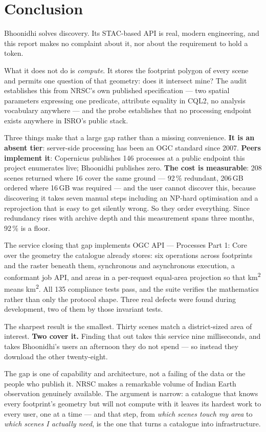 \section{Conclusion}

Bhoonidhi solves discovery. Its STAC-based API is real, modern engineering, and
this report makes no complaint about it, nor about the requirement to hold a
token.

What it does not do is \emph{compute}. It stores the footprint polygon of every
scene and permits one question of that geometry: does it intersect mine? The
audit establishes this from NRSC's own published specification --- two spatial
parameters expressing one predicate, attribute equality in CQL2, no analysis
vocabulary anywhere --- and the probe establishes that no processing endpoint
exists anywhere in ISRO's public stack.

Three things make that a large gap rather than a missing convenience.
\textbf{It is an absent tier}: server-side processing has been an OGC standard
since 2007. \textbf{Peers implement it}: Copernicus publishes 146 processes at a
public endpoint this project enumerates live; Bhoonidhi publishes zero.
\textbf{The cost is measurable}: 208 scenes returned where 16 cover the same
ground --- 92\,\% redundant, 206\,GB ordered where 16\,GB was required --- and
the user cannot discover this, because discovering it takes seven manual steps
including an NP-hard optimisation and a reprojection that is easy to get
silently wrong. So they order everything. Since redundancy rises with archive
depth and this measurement spans three months, 92\,\% is a floor.

The service closing that gap implements OGC API --- Processes Part 1: Core over
the geometry the catalogue already stores: six operations across footprints and
the raster beneath them, synchronous and asynchronous execution, a conformant
job API, and areas in a per-request equal-area projection so that
km\textsuperscript{2} means km\textsuperscript{2}. All 135 compliance tests
pass, and the suite verifies the mathematics rather than only the protocol
shape. Three real defects were found during development, two of them by those
invariant tests.

The sharpest result is the smallest. Thirty scenes match a district-sized area
of interest. \textbf{Two cover it.} Finding that out takes this service nine
milliseconds, and takes Bhoonidhi's users an afternoon they do not spend --- so
instead they download the other twenty-eight.

The gap is one of capability and architecture, not a failing of the data or the
people who publish it. NRSC makes a remarkable volume of Indian Earth
observation genuinely available. The argument is narrow: a catalogue that knows
every footprint's geometry but will not compute with it leaves its hardest work
to every user, one at a time --- and that step, from \emph{which scenes touch my
area} to \emph{which scenes I actually need}, is the one that turns a catalogue
into infrastructure.
